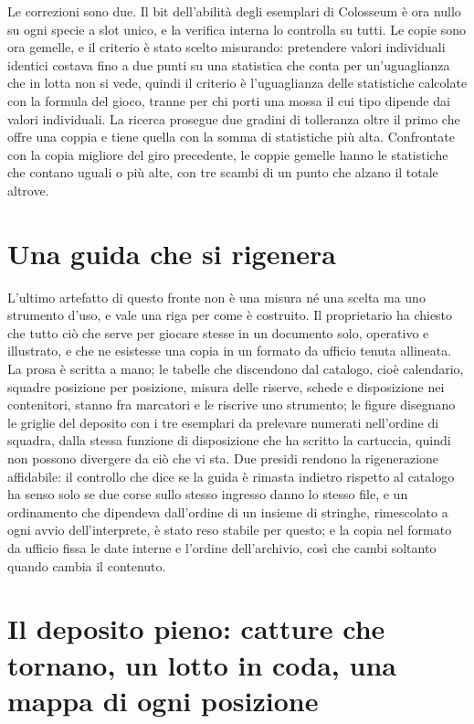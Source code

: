 Le correzioni sono due. Il bit dell'abilità degli esemplari di Colosseum è ora nullo su ogni specie a slot unico, e la verifica interna lo controlla su tutti. Le copie sono ora gemelle, e il criterio è stato scelto misurando: pretendere valori individuali identici costava fino a due punti su una statistica che conta per un'uguaglianza che in lotta non si vede, quindi il criterio è l'uguaglianza delle statistiche calcolate con la formula del gioco, tranne per chi porti una mossa il cui tipo dipende dai valori individuali. La ricerca prosegue due gradini di tolleranza oltre il primo che offre una coppia e tiene quella con la somma di statistiche più alta. Confrontate con la copia migliore del giro precedente, le coppie gemelle hanno le statistiche che contano uguali o più alte, con tre scambi di un punto che alzano il totale altrove.

\section{Una guida che si rigenera}

L'ultimo artefatto di questo fronte non è una misura né una scelta ma uno strumento d'uso, e vale una riga per come è costruito. Il proprietario ha chiesto che tutto ciò che serve per giocare stesse in un documento solo, operativo e illustrato, e che ne esistesse una copia in un formato da ufficio tenuta allineata. La prosa è scritta a mano; le tabelle che discendono dal catalogo, cioè calendario, squadre posizione per posizione, misura delle riserve, schede e disposizione nei contenitori, stanno fra marcatori e le riscrive uno strumento; le figure disegnano le griglie del deposito con i tre esemplari da prelevare numerati nell'ordine di squadra, dalla stessa funzione di disposizione che ha scritto la cartuccia, quindi non possono divergere da ciò che vi sta. Due presidi rendono la rigenerazione affidabile: il controllo che dice se la guida è rimasta indietro rispetto al catalogo ha senso solo se due corse sullo stesso ingresso danno lo stesso file, e un ordinamento che dipendeva dall'ordine di un insieme di stringhe, rimescolato a ogni avvio dell'interprete, è stato reso stabile per questo; e la copia nel formato da ufficio fissa le date interne e l'ordine dell'archivio, così che cambi soltanto quando cambia il contenuto.

\section{Il deposito pieno: catture che tornano, un lotto in coda, una mappa di ogni posizione}

